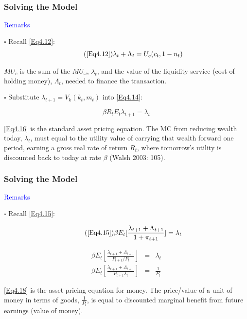 \documentclass[handout]{beamer}
\begin{document}
\begin{frame}
\frametitle{Solving the Model}
\vskip 0.1in

\textcolor{blue}{Remarks}\vskip 0.1in

$\square$ Recall \eqref{Eq4.12}:
\begin{equation}\tag{\eqref{Eq4.12}}
\lambda_{t} + \Lambda_{t} = U_{c}(c_{t}, 1-n_t)
\end{equation}

$MU_{c}$ is the sum of the $MU_{\omega}$, $\lambda_{t}$, and the
value of the liquidity service (cost of holding money),
$\Lambda_{t}$, needed to finance the transaction.

\vskip 0.1in \pause

$\square$ Substitute $\lambda_{t+1} = V_{k}(k_t,m_{t})$ into
\eqref{Eq4.14}:

\begin{equation}\label{Eq4.16}
\beta R_{t}E_{t}\lambda_{t+1} = \lambda_{t}
\end{equation}

\eqref{Eq4.16} is the standard asset pricing equation. The MC from
reducing wealth today, $\lambda_{t}$, must equal to the utility
value of carrying that wealth forward one period, earning a gross
real rate of return $R_{t}$, where tomorrow's utility is discounted
back to today at rate $\beta$ (Walsh 2003: 105).

\end{frame}

\begin{frame}
\frametitle{Solving the Model} \vskip 0.1in

\textcolor{blue}{Remarks}\vskip 0.1in

$\square$ Recall \eqref{Eq4.15}:

\begin{equation}\tag{\eqref{Eq4.15}}
\beta E_{t} [\frac{\lambda_{t+1}+\Lambda_{t+1}}{1+\pi_{t+1}}] =
\lambda_{t}
\end{equation}

\begin{eqnarray}
\beta E_{t} [\frac{\lambda_{t+1}+\Lambda_{t+1}}{P_{t+1}/P_{t}}] &=&
\lambda_{t}\label{Eq4.17}\\
\beta E_{t} [\frac{\lambda_{t+1}+\Lambda_{t+1}}{P_{t+1}\lambda_{t}}]
&=& \frac{1}{P_{t}}\label{Eq4.18}
\end{eqnarray}

\eqref{Eq4.18} is the asset pricing equation for money. The
price/value of a unit of money in terms of goods, $\frac{1}{P_{t}}$,
is equal to discounted marginal benefit from future earnings (value
of money).

\end{frame}
\end{document}
